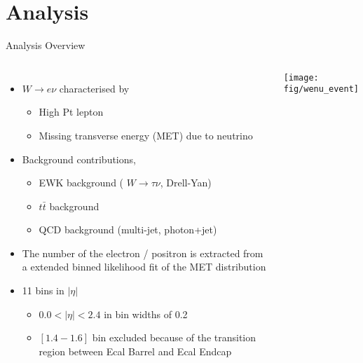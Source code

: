 \documentclass[t, 8pt]{beamer}
\begin{document}
\section{Analysis}

\begin{frame}{Analysis Overview}
  \begin{columns}[c]
  \begin{itemize}
    \item $W \to e\nu$ characterised by 
    \begin{itemize}
      \item High Pt lepton 
      \item Missing transverse energy (MET) due to neutrino
    \end{itemize}
    \item Background contributions,
    \begin{itemize}
      \item EWK background ( $W \to \tau\nu$, Drell-Yan)
      \item $t\bar{t}$ background
      \item QCD background (multi-jet, photon+jet)
    \end{itemize}
    \item The number of the electron / positron is extracted from a extended binned likelihood fit of the MET distribution
    \item 11 bins in $|\eta|$
    \begin{itemize}
      \item $0.0 < |\eta| < 2.4$ in bin widths of 0.2
      \item $[1.4-1.6]$ bin excluded because of the transition region between Ecal Barrel and Ecal Endcap
    \end{itemize}
  \end{itemize}
    \texttt{[image: fig/wenu\_event]}
  \end{columns}
\end{frame}
\end{document}
